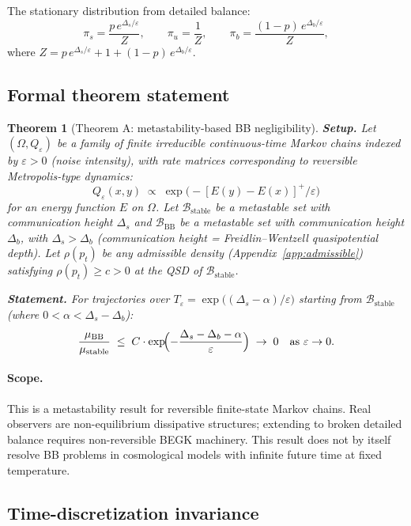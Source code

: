 \documentclass[12pt]{article}
\newtheorem{theorem}{Theorem}
\theoremstyle{remark}
\begin{document}
The stationary distribution from detailed balance:
\[
  \pi_s = \frac{p\,e^{\Delta_s/\varepsilon}}{Z}, \qquad
  \pi_u = \frac{1}{Z}, \qquad
  \pi_b = \frac{(1-p)\,e^{\Delta_b/\varepsilon}}{Z},
\]
where $Z = p\,e^{\Delta_s/\varepsilon} + 1 + (1-p)\,e^{\Delta_b/\varepsilon}$.

\subsection{Formal theorem statement}\label{app:formal-theorem}

\begin{theorem}[Theorem A: metastability-based BB negligibility]\label{thm:A}
\textbf{Setup.} Let $(\Omega, Q_\varepsilon)$ be a family of finite irreducible continuous-time Markov chains indexed by $\varepsilon > 0$ (noise intensity), with rate matrices corresponding to reversible Metropolis-type dynamics:
\[
  Q_\varepsilon(x,y) \;\propto\; \exp\!\bigl(-[E(y) - E(x)]^+ / \varepsilon\bigr)
\]
for an energy function $E$ on $\Omega$. Let $\mathcal{B}_{\mathrm{stable}}$ be a metastable set with communication height $\Delta_s$ and $\mathcal{B}_{\mathrm{BB}}$ be a metastable set with communication height $\Delta_b$, with $\Delta_s > \Delta_b$ (communication height = Freidlin--Wentzell quasipotential depth). Let $\rho(p_t)$ be any admissible density (Appendix~\ref{app:admissible}) satisfying $\rho(p_t) \geq c > 0$ at the QSD of $\mathcal{B}_{\mathrm{stable}}$.

\medskip\noindent\textbf{Statement.} For trajectories over $T_\varepsilon = \exp\bigl((\Delta_s - \alpha)/\varepsilon\bigr)$ starting from $\mathcal{B}_{\mathrm{stable}}$ (where $0 < \alpha < \Delta_s - \Delta_b$):
\[
  \frac{\mu_{\mathrm{BB}}}{\mu_{\mathrm{stable}}} \;\leq\; C \cdot \exp\!\Bigl(-\frac{\Delta_s - \Delta_b - \alpha}{\varepsilon}\Bigr) \;\to\; 0 \quad \text{as } \varepsilon \to 0.
\]
\end{theorem}

\paragraph{Scope.} This is a metastability result for reversible finite-state Markov chains. Real observers are non-equilibrium dissipative structures; extending to broken detailed balance requires non-reversible BEGK machinery. This result does not by itself resolve BB problems in cosmological models with infinite future time at fixed temperature.

\subsection{Time-discretization invariance}\label{sec:time-disc}
\end{document}
